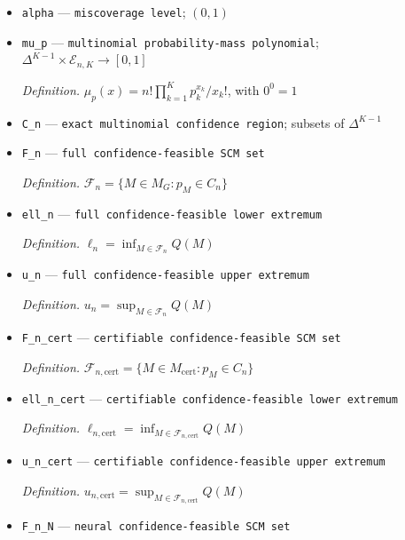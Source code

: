 \documentclass{article}
\begin{document}
\begin{itemize}
  \par\smallskip\noindent\emph{Definition.} \(N_k=\sum_{i=1}^n\mathbf 1\{\kappa(O_i)=k\}\)
  \item \texttt{alpha} --- \texttt{miscoverage level}; \((0,1)\)
  \item \texttt{mu\_\allowbreak{}p} --- \texttt{multinomial probability-\allowbreak{}mass polynomial}; \(\Delta^{K-1}\times\mathcal E_{n,K}\to[0,1]\)
  \par\smallskip\noindent\emph{Definition.} \(\mu_p(x)=n!\prod_{k=1}^K p_k^{x_k}/x_k!\), with \(0^0=1\)
  \item \texttt{C\_\allowbreak{}n} --- \texttt{exact multinomial confidence region}; subsets of \(\Delta^{K-1}\)
  \item \texttt{F\_\allowbreak{}n} --- \texttt{full confidence-\allowbreak{}feasible SCM set}
  \par\smallskip\noindent\emph{Definition.} \(\mathcal F_n=\{M\in M_G:p_M\in C_n\}\)
  \item \texttt{ell\_\allowbreak{}n} --- \texttt{full confidence-\allowbreak{}feasible lower extremum}
  \par\smallskip\noindent\emph{Definition.} \(\ell_n=\inf_{M\in\mathcal F_n}Q(M)\)
  \item \texttt{u\_\allowbreak{}n} --- \texttt{full confidence-\allowbreak{}feasible upper extremum}
  \par\smallskip\noindent\emph{Definition.} \(u_n=\sup_{M\in\mathcal F_n}Q(M)\)
  \item \texttt{F\_\allowbreak{}n\_\allowbreak{}cert} --- \texttt{certifiable confidence-\allowbreak{}feasible SCM set}
  \par\smallskip\noindent\emph{Definition.} \(\mathcal F_{n,\mathrm{cert}}=\{M\in M_{\mathrm{cert}}:p_M\in C_n\}\)
  \item \texttt{ell\_\allowbreak{}n\_\allowbreak{}cert} --- \texttt{certifiable confidence-\allowbreak{}feasible lower extremum}
  \par\smallskip\noindent\emph{Definition.} \(\ell_{n,\mathrm{cert}}=\inf_{M\in\mathcal F_{n,\mathrm{cert}}}Q(M)\)
  \item \texttt{u\_\allowbreak{}n\_\allowbreak{}cert} --- \texttt{certifiable confidence-\allowbreak{}feasible upper extremum}
  \par\smallskip\noindent\emph{Definition.} \(u_{n,\mathrm{cert}}=\sup_{M\in\mathcal F_{n,\mathrm{cert}}}Q(M)\)
  \item \texttt{F\_\allowbreak{}n\_\allowbreak{}N} --- \texttt{neural confidence-\allowbreak{}feasible SCM set}

\end{itemize}
\end{document}
